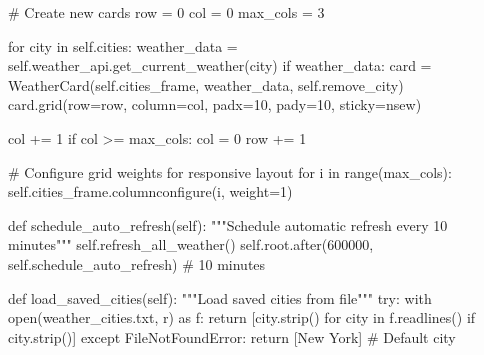 \documentclass[
  letterpaper,
  DIV=11,
  numbers=noendperiod,
  oneside]{scrreprt}
\newenvironment{Shaded}{}{}
\newcommand{\BuiltInTok}[1]{\textcolor[rgb]{0.84,0.23,0.29}{#1}}
\newcommand{\CommentTok}[1]{\textcolor[rgb]{0.42,0.45,0.49}{#1}}
\newcommand{\ControlFlowTok}[1]{\textcolor[rgb]{0.84,0.23,0.29}{#1}}
\newcommand{\DecValTok}[1]{\textcolor[rgb]{0.00,0.36,0.77}{#1}}
\newcommand{\ImportTok}[1]{\textcolor[rgb]{0.01,0.18,0.38}{#1}}
\newcommand{\KeywordTok}[1]{\textcolor[rgb]{0.84,0.23,0.29}{#1}}
\newcommand{\NormalTok}[1]{\textcolor[rgb]{0.14,0.16,0.18}{#1}}
\newcommand{\OperatorTok}[1]{\textcolor[rgb]{0.14,0.16,0.18}{#1}}
\newcommand{\PreprocessorTok}[1]{\textcolor[rgb]{0.84,0.23,0.29}{#1}}
\newcommand{\StringTok}[1]{\textcolor[rgb]{0.01,0.18,0.38}{#1}}
\newcommand{\VariableTok}[1]{\textcolor[rgb]{0.89,0.38,0.04}{#1}}
\begin{document}
\begin{Shaded}
\begin{Highlighting}[]
        \CommentTok{\# Create new cards}
\NormalTok{        row }\OperatorTok{=} \DecValTok{0}
\NormalTok{        col }\OperatorTok{=} \DecValTok{0}
\NormalTok{        max\_cols }\OperatorTok{=} \DecValTok{3}
        
        \ControlFlowTok{for}\NormalTok{ city }\KeywordTok{in} \VariableTok{self}\NormalTok{.cities:}
\NormalTok{            weather\_data }\OperatorTok{=} \VariableTok{self}\NormalTok{.weather\_api.get\_current\_weather(city)}
            \ControlFlowTok{if}\NormalTok{ weather\_data:}
\NormalTok{                card }\OperatorTok{=}\NormalTok{ WeatherCard(}\VariableTok{self}\NormalTok{.cities\_frame, weather\_data, }\VariableTok{self}\NormalTok{.remove\_city)}
\NormalTok{                card.grid(row}\OperatorTok{=}\NormalTok{row, column}\OperatorTok{=}\NormalTok{col, padx}\OperatorTok{=}\DecValTok{10}\NormalTok{, pady}\OperatorTok{=}\DecValTok{10}\NormalTok{, sticky}\OperatorTok{=}\StringTok{\textquotesingle{}nsew\textquotesingle{}}\NormalTok{)}
                
\NormalTok{                col }\OperatorTok{+=} \DecValTok{1}
                \ControlFlowTok{if}\NormalTok{ col }\OperatorTok{\textgreater{}=}\NormalTok{ max\_cols:}
\NormalTok{                    col }\OperatorTok{=} \DecValTok{0}
\NormalTok{                    row }\OperatorTok{+=} \DecValTok{1}
        
        \CommentTok{\# Configure grid weights for responsive layout}
        \ControlFlowTok{for}\NormalTok{ i }\KeywordTok{in} \BuiltInTok{range}\NormalTok{(max\_cols):}
            \VariableTok{self}\NormalTok{.cities\_frame.columnconfigure(i, weight}\OperatorTok{=}\DecValTok{1}\NormalTok{)}
    
    \KeywordTok{def}\NormalTok{ schedule\_auto\_refresh(}\VariableTok{self}\NormalTok{):}
        \CommentTok{"""Schedule automatic refresh every 10 minutes"""}
        \VariableTok{self}\NormalTok{.refresh\_all\_weather()}
        \VariableTok{self}\NormalTok{.root.after(}\DecValTok{600000}\NormalTok{, }\VariableTok{self}\NormalTok{.schedule\_auto\_refresh)  }\CommentTok{\# 10 minutes}
    
    \KeywordTok{def}\NormalTok{ load\_saved\_cities(}\VariableTok{self}\NormalTok{):}
        \CommentTok{"""Load saved cities from file"""}
        \ControlFlowTok{try}\NormalTok{:}
            \ControlFlowTok{with} \BuiltInTok{open}\NormalTok{(}\StringTok{\textquotesingle{}weather\_cities.txt\textquotesingle{}}\NormalTok{, }\StringTok{\textquotesingle{}r\textquotesingle{}}\NormalTok{) }\ImportTok{as}\NormalTok{ f:}
                \ControlFlowTok{return}\NormalTok{ [city.strip() }\ControlFlowTok{for}\NormalTok{ city }\KeywordTok{in}\NormalTok{ f.readlines() }\ControlFlowTok{if}\NormalTok{ city.strip()]}
        \ControlFlowTok{except} \PreprocessorTok{FileNotFoundError}\NormalTok{:}
            \ControlFlowTok{return}\NormalTok{ [}\StringTok{\textquotesingle{}New York\textquotesingle{}}\NormalTok{]  }\CommentTok{\# Default city}
    

\end{Highlighting}
\end{Shaded}
\end{document}
